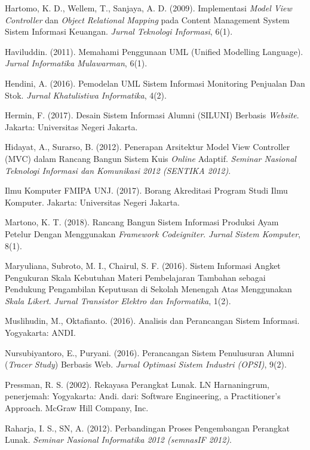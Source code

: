 \documentclass{jtetiskripsi}
\begin{document}
\begin{thebibliography}{99}
 Hartomo, K. D., Wellem, T., Sanjaya, A. D. (2009). Implementasi \textit{Model View Controller} dan \textit{Object Relational Mapping} pada Content Management System Sistem Informasi Keuangan. \textit{Jurnal Teknologi Informasi}, 6(1).

 Haviluddin. (2011). Memahami Penggunaan UML (Unified Modelling Language). \textit{Jurnal Informatika Mulawarman}, 6(1).

 Hendini, A. (2016). Pemodelan UML Sistem Informasi Monitoring Penjualan Dan Stok. \textit{Jurnal Khatulistiwa Informatika}, 4(2).

 Hermin, F. (2017). Desain Sistem Informasi Alumni (SILUNI) Berbasis \textit{Website}. Jakarta: Universitas Negeri Jakarta.

 Hidayat, A., Surarso, B. (2012). Penerapan Arsitektur Model View Controller (MVC) dalam Rancang Bangun Sistem Kuis \textit{Online} Adaptif. \textit{Seminar Nasional Teknologi Informasi dan Komunikasi 2012 (SENTIKA 2012)}.

 Ilmu Komputer FMIPA UNJ. (2017). Borang Akreditasi Program Studi Ilmu Komputer. Jakarta: Universitas Negeri Jakarta.

 Martono, K. T. (2018). Rancang Bangun Sistem Informasi Produksi Ayam Petelur Dengan Menggunakan \textit{Framework Codeigniter}. \textit{Jurnal Sistem Komputer}, 8(1).

 Maryuliana, Subroto, M. I., Chairul, S. F. (2016). Sistem Informasi Angket Pengukuran Skala Kebutuhan Materi Pembelajaran Tambahan sebagai Pendukung Pengambilan Keputusan di Sekolah Menengah Atas Menggunakan \textit{Skala Likert}. \textit{Jurnal Transistor Elektro dan Informatika}, 1(2).

 Muslihudin, M., Oktafianto. (2016). Analisis dan Perancangan Sistem Informasi. Yogyakarta: ANDI.

 Nursubiyantoro, E., Puryani. (2016). Perancangan Sistem Penulusuran Alumni (\textit{Tracer Study}) Berbasis Web. \textit{Jurnal Optimasi Sistem Industri (OPSI)}, 9(2).

 Pressman, R. S. (2002). Rekayasa Perangkat Lunak. LN Harnaningrum, penerjemah: Yogyakarta: Andi.  dari: Software Engineering, a Practitioner's Approach. McGraw Hill Company, Inc.

 Raharja, I. S., SN, A. (2012). Perbandingan Proses Pengembangan Perangkat Lunak. \textit{Seminar Nasional Informatika 2012 (semnasIF 2012)}.


\end{thebibliography}
\end{document}
